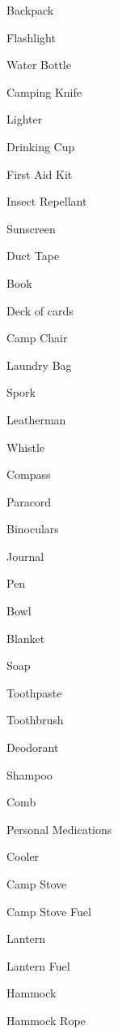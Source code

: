 \documentclass{article}
\begin{document}
\begin{multicols*}{3}
    \begin{packlist}
      \item Backpack
      \item Flashlight
      \item Water Bottle
      \item Camping Knife
      \item Lighter
      \item Drinking Cup
      \item First Aid Kit
      \item Insect Repellant
      \item Sunscreen
      \item Duct Tape
      \item Book
      \item Deck of cards
      \item Camp Chair
      \item Laundry Bag
      \item Spork
      \item Leatherman
      \item Whistle
      \item Compass
      \item Paracord
      \item Binoculars
      \item Journal
      \item Pen
      \item Bowl
      \item Blanket
    \end{packlist}


    \begin{packlist}
      \item Soap
      \item Toothpaste
      \item Toothbrush
      \item Deodorant
      \item Shampoo
      \item Comb
      \item Personal Medications
    \end{packlist}


    \begin{packlist}
      \item Cooler
      \item Camp Stove
      \item Camp Stove Fuel
      \item Lantern
      \item Lantern Fuel
      \item Hammock
      \item Hammock Rope
    \end{packlist}

  \end{multicols*}
\end{document}
